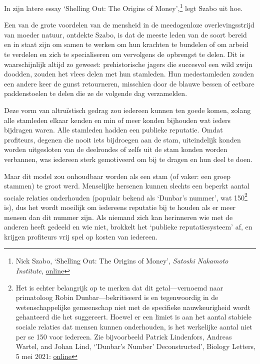 \documentclass[smalldemyvopaper,11pt,twoside,onecolumn,openright,extrafontsizes,hidelinks]{memoir}
\begin{document}
In zijn latere essay `Shelling Out: The Origins of Money',\footnote{Nick
  Szabo, `Shelling Out: The Origins of Money', \emph{Satoshi Nakamoto
  Institute},
  \href{https://nakamotoinstitute.org/library/shelling-out/}{online}}
legt Szabo uit hoe.

Een van de grote voordelen van de mensheid in de meedogenloze
overlevingsstrijd van moeder natuur, ontdekte Szabo, is dat de meeste
leden van de soort bereid en in staat zijn om samen te werken om hun
krachten te bundelen of om arbeid te verdelen en zich te specialiseren
om vervolgens de opbrengst te delen. Dit is waarschijnlijk altijd zo
geweest: prehistorische jagers die succesvol een wild zwijn doodden,
zouden het vlees delen met hun stamleden. Hun medestamleden zouden een
andere keer de gunst retourneren, misschien door de blauwe bessen of
eetbare paddenstoelen te delen die ze de volgende dag verzamelden.

Deze vorm van altruïstisch gedrag zou iedereen kunnen ten goede komen,
zolang alle stamleden elkaar kenden en min of meer konden bijhouden wat
ieders bijdragen waren. Alle stamleden hadden een publieke reputatie.
Omdat profiteurs, degenen die nooit iets bijdroegen aan de stam,
uiteindelijk konden worden uitgesloten van de deelrondes of zelfs uit de
stam konden worden verbannen, was iedereen sterk gemotiveerd om bij te
dragen en hun deel te doen.

Maar dit model zou onhoudbaar worden als een stam (of vaker: een groep
stammen) te groot werd. Menselijke hersenen kunnen slechts een beperkt
aantal sociale relaties onderhouden (populair bekend als `Dunbar's
nummer', wat 150\footnote{Het is echter belangrijk op te merken dat dit
  getal---vernoemd naar primatoloog Robin Dunbar---bekritiseerd is en
  tegenwoordig in de wetenschappelijke gemeenschap niet met de
  specifieke nauwkeurigheid wordt gehanteerd die het suggereert. Hoewel
  er een limiet is aan het aantal stabiele sociale relaties dat mensen
  kunnen onderhouden, is het werkelijke aantal niet per se 150 voor
  iedereen. Zie bijvoorbeeld Patrick Lindenfors, Andreas Wartel, and
  Johan Lind, `'Dunbar's Number' Deconstructed', Biology Letters, 5 mei
  2021:
  \href{https://royalsocietypublishing.org/doi/10.1098/rsbl.2021.0158}{online}}
is), dus het wordt moeilijk om iedereens reputatie bij te houden als er
meer mensen dan dit nummer zijn. Als niemand zich kan herinneren wie met
de anderen heeft gedeeld en wie niet, brokkelt het `publieke
reputatiesysteem' af, en krijgen profiteurs vrij spel op kosten van
iedereen.
\end{document}

